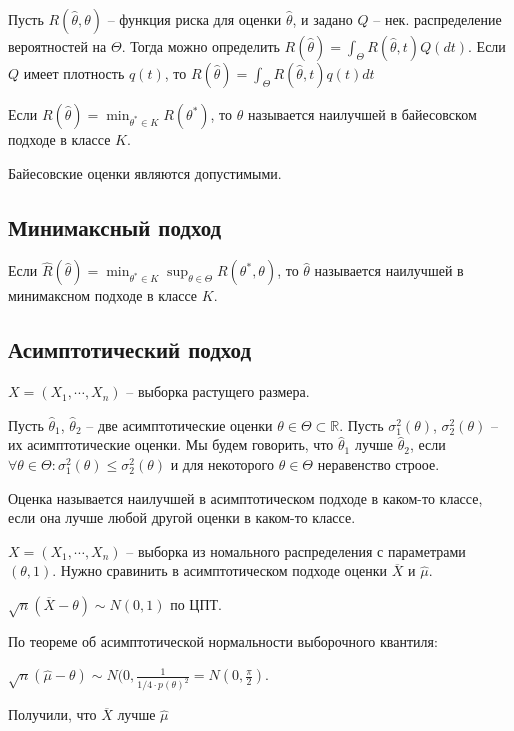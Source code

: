 \documentclass[document.tex]{subfiles}
\begin{document}
Пусть $R(\hat \theta, \theta)$ -- функция риска для оценки $\hat \theta$, и задано $Q$ -- нек. распределение
вероятностей на $\Theta$. Тогда можно определить $R(\hat \theta) = \int_{\Theta} R(\hat \theta, t) Q(dt)$. Если $Q$
имеет плотность $q(t)$, то $R(\hat \theta) = \int_{\Theta} R(\hat \theta, t) q(t) dt$

\begin{definition}
    Если $R(\hat \theta) = \min_{\theta^* \in K} R(\theta^*)$, то $\hat \theta$ называется наилучшей в байесовском
    подходе в классе $K$.
\end{definition}

Байесовские оценки являются допустимыми.

\subsection{Минимаксный подход}

Если $\hat R(\hat \theta) = \min_{\theta^* \in K} \sup_{\theta \in \Theta} R(\theta^*, \theta)$, то $\hat \theta$
называется наилучшей в минимаксном подходе в классе $K$.

\subsection{Асимптотический подход}
$X = (X_1, \cdots, X_n)$ -- выборка растущего размера.

Пусть $\hat \theta_1$, $\hat \theta_2$ -- две асимптотические оценки $\theta \in \Theta \subset \mathbb{R}$. Пусть
$\sigma_1^2(\theta)$, $\sigma_2^2(\theta)$ -- их асимптотические оценки. Мы будем говорить, что $\hat \theta_1$ лучше
$\hat \theta_2$, если $\forall \theta \in \Theta: \sigma_1^2(\theta) \leq \sigma_2^2(\theta)$ и для некоторого $\theta
\in \Theta$ неравенство строое.

Оценка называется наилучшей в асимптотическом подходе в каком-то классе, если она лучше любой другой оценки в каком-то
классе. 

\begin{example}
    $X = (X_1, \cdots, X_n)$ -- выборка из номального распределения с параметрами $(\theta, 1)$. Нужно сравинить в
    асимптотическом подходе оценки $\overline X$ и $\hat \mu$.

    $\sqrt{n}(\overline X - \theta) \sim N(0, 1)$ по ЦПТ.

    По теореме об асимптотической нормальности выборочного квантиля:

    $\sqrt{n}(\hat \mu - \theta) \sim N(0, \frac{1}{1/4 \cdot p(\theta)^2} = N(0, \frac{\pi}{2})$.

    Получили, что $\overline X$ лучше $\hat \mu$
\end{example}
\end{document}
